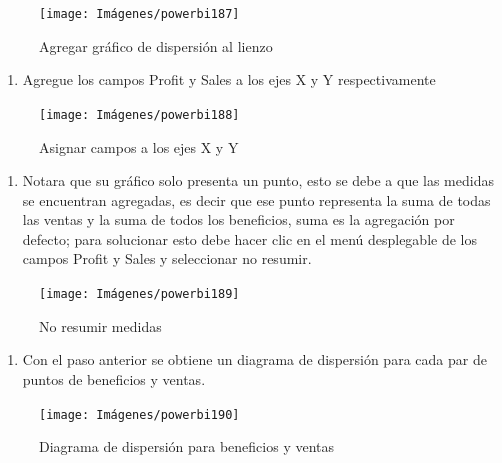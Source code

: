 \documentclass[
]{book}
\providecommand{\tightlist}{%
  \setlength{\itemsep}{0pt}\setlength{\parskip}{0pt}}
\begin{document}
\begin{figure}

{\centering \texttt{[image: Imágenes/powerbi187]} 

}

\caption{Agregar gráfico de dispersión al lienzo}\label{fig:paso1dispersionpowerbi-fig}
\end{figure}

\begin{enumerate}
\def\labelenumi{\arabic{enumi}.}
\setcounter{enumi}{1}
\tightlist
\item
  Agregue los campos Profit y Sales a los ejes X y Y respectivamente
\end{enumerate}

\begin{figure}

{\centering \texttt{[image: Imágenes/powerbi188]} 

}

\caption{Asignar campos a los ejes X y Y}\label{fig:paso2dispersionpowerbi-fig}
\end{figure}

\begin{enumerate}
\def\labelenumi{\arabic{enumi}.}
\setcounter{enumi}{2}
\tightlist
\item
  Notara que su gráfico solo presenta un punto, esto se debe a que las medidas se encuentran agregadas, es decir que ese punto representa la suma de todas las ventas y la suma de todos los beneficios, suma es la agregación por defecto; para solucionar esto debe hacer clic en el menú desplegable de los campos Profit y Sales y seleccionar no resumir.
\end{enumerate}

\begin{figure}

{\centering \texttt{[image: Imágenes/powerbi189]} 

}

\caption{No resumir medidas}\label{fig:paso3dispersionpowerbi-fig}
\end{figure}

\begin{enumerate}
\def\labelenumi{\arabic{enumi}.}
\setcounter{enumi}{3}
\tightlist
\item
  Con el paso anterior se obtiene un diagrama de dispersión para cada par de puntos de beneficios y ventas.
\end{enumerate}

\begin{figure}

{\centering \texttt{[image: Imágenes/powerbi190]} 

}

\caption{Diagrama de dispersión para beneficios y ventas}\label{fig:paso4dispersionpowerbi-fig}
\end{figure}
\end{document}
